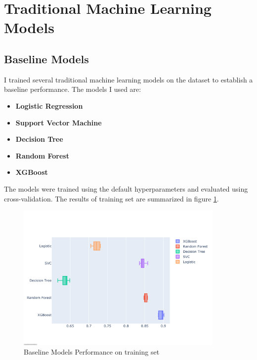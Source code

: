 \documentclass[11.5pt]{article}
\begin{document}
\section{Traditional Machine Learning Models} \label{sec:traditional_ml}
\subsection{Baseline Models}
I trained several traditional machine learning models on the dataset to establish a baseline performance. The models I used are:
\begin{itemize}
    \item \textbf{Logistic Regression}
    \item \textbf{Support Vector Machine}
    \item \textbf{Decision Tree}
    \item \textbf{Random Forest}
    \item \textbf{XGBoost}
\end{itemize}
The models were trained using the default hyperparameters and evaluated using cross-validation. The results of training set are summarized in figure \ref{fig:baseline_models}.
\begin{figure}[H]
    \centering
    \includegraphics[width=0.9\textwidth]{graphics/baseline_models.pdf}
    \caption{Baseline Models Performance on training set}
    \label{fig:baseline_models}
\end{figure}
\end{document}
